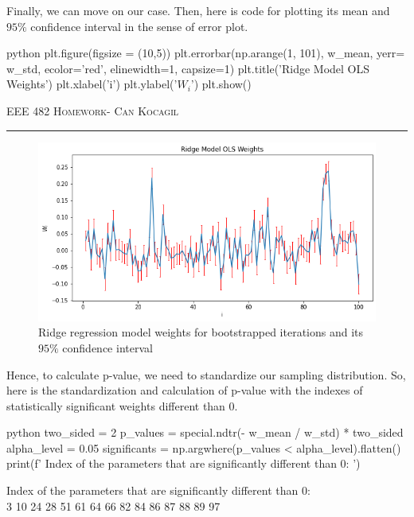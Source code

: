 \documentclass[12pt]{amsart}
\begin{document}
\bigskip
Finally, we can move on our case. Then, here is code for plotting its mean and $95\%$ confidence interval in the sense of error plot.
\begin{mintedbox}{python}
plt.figure(figsize = (10,5))
plt.errorbar(np.arange(1, 101),
             w_mean,
             yerr= w_std,
             ecolor='red',
             elinewidth=1,
             capsize=1)
plt.title('Ridge Model OLS Weights')
plt.xlabel('i')
plt.ylabel('$W_i$')
plt.show()
\end{mintedbox}

\newpage
{\scshape EEE 482} \hfill {\scshape \large  Homework-\relax} \hfill {\scshape Can Kocagil}
\smallskip
\hrule
\vspace{2mm}

\begin{figure}[h]
    \centering
    \includegraphics[width = 1\textwidth]{images/3.png}
    \caption{Ridge regression model weights for bootstrapped iterations and its $95\%$ confidence interval}
\end{figure}

Hence, to calculate p-value, we need to standardize our sampling distribution. So, here is the standardization and calculation of p-value with the indexes of statistically significant weights different than 0.

\begin{mintedbox}{python}
two_sided = 2
p_values = special.ndtr(- w_mean / w_std) * two_sided
alpha_level = 0.05
significants = np.argwhere(p_values < alpha_level).flatten()
print(f' Index of the parameters that are significantly different than 0: ')
     
\end{mintedbox}

Index of the parameters that are significantly different than 0:  \\
 3 10 24 28 51 61 64 66 82 84 86 87 88 89 97
\end{document}
